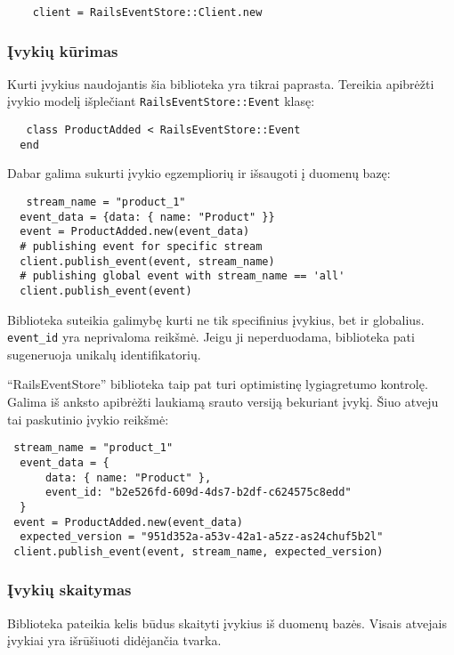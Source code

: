 \begin{lstlisting}[]
    client = RailsEventStore::Client.new
\end{lstlisting}

\subsubsection{Įvykių kūrimas}

Kurti įvykius naudojantis šia biblioteka yra tikrai paprasta. Tereikia apibrėžti įvykio modelį išplečiant \lstinline{RailsEventStore::Event} klasę:

\begin{lstlisting}[]
   class ProductAdded < RailsEventStore::Event 
  end
\end{lstlisting}

Dabar galima sukurti įvykio egzempliorių ir išsaugoti į duomenų bazę:

\begin{lstlisting}[]
   stream_name = "product_1" 
  event_data = {data: { name: "Product" }}
  event = ProductAdded.new(event_data)
  # publishing event for specific stream
  client.publish_event(event, stream_name)
  # publishing global event with stream_name == 'all'
  client.publish_event(event)
\end{lstlisting}

Biblioteka suteikia galimybę kurti ne tik specifinius įvykius, bet ir globalius. \lstinline|event_id| yra neprivaloma reikšmė. Jeigu ji neperduodama, biblioteka pati sugeneruoja unikalų identifikatorių.

``RailsEventStore'' biblioteka taip pat turi optimistinę lygiagretumo kontrolę. Galima iš anksto apibrėžti laukiamą srauto versiją bekuriant įvykį. Šiuo atveju tai paskutinio įvykio reikšmė:

\begin{lstlisting}[]
 stream_name = "product_1" 
  event_data = { 
      data: { name: "Product" }, 
      event_id: "b2e526fd-609d-4ds7-b2df-c624575c8edd" 
  }
 event = ProductAdded.new(event_data) 
  expected_version = "951d352a-a53v-42a1-a5zz-as24chuf5b2l"
 client.publish_event(event, stream_name, expected_version)
\end{lstlisting}

\subsubsection{Įvykių skaitymas}

Biblioteka pateikia kelis būdus skaityti įvykius iš duomenų bazės. Visais atvejais įvykiai yra išrūšiuoti didėjančia tvarka.

